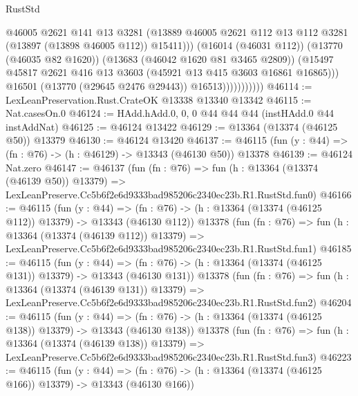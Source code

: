 \begin{lexlean}{RustStd}
\begin{coremodule}
                                @46005
                                @2621
                                @141
                                @13
                                @3281
                                (@13889
                                  @46005
                                  @2621
                                  @112
                                  @13
                                  @112
                                  @3281
                                  (@13897 (@13898 @46005 @112))
                                  @15411)))
                            (@16014 (@46031 @112))
                            (@13770 (@46035 @82 @1620))
                            (@13683 (@46042 @1620 @81 @3465 @2809))
                            (@15497
                              @45817
                              @2621
                              @416
                              @13
                              @3603
                              (@45921 @13 @415 @3603 @16861 @16865)))
                          @16501
                          (@13770 (@29645 @2476 @29443))
                          @16513)))))))))))
@46114 := LexLeanPreservation.Rust.CrateOK @13338 @13340 @13342
@46115 := Nat.casesOn.{0}
@46124 := HAdd.hAdd.{0, 0, 0} @44 @44 @44 (instHAdd.{0} @44 instAddNat)
@46125 := @46124 @13422
@46129 := @13364 (@13374 (@46125 @50)) @13379
@46130 := @46124 @13420
@46137 := @46115 (fun (y : @44) => (fn : @76) -> (h : @46129) -> @13343 (@46130 @50)) @13378
@46139 := @46124 Nat.zero
@46147 := @46137
    (fun (fn : @76) =>
    fun (h : @13364 (@13374 (@46139 @50)) @13379) =>
    LexLeanPreserve.Cc5b6f2e6d9333bad985206c2340ec23b.R1.RustStd.fun0)
@46166 := @46115
    (fun (y : @44) =>
    (fn : @76) -> (h : @13364 (@13374 (@46125 @112)) @13379) -> @13343 (@46130 @112))
    @13378
    (fun (fn : @76) =>
    fun (h : @13364 (@13374 (@46139 @112)) @13379) =>
    LexLeanPreserve.Cc5b6f2e6d9333bad985206c2340ec23b.R1.RustStd.fun1)
@46185 := @46115
    (fun (y : @44) =>
    (fn : @76) -> (h : @13364 (@13374 (@46125 @131)) @13379) -> @13343 (@46130 @131))
    @13378
    (fun (fn : @76) =>
    fun (h : @13364 (@13374 (@46139 @131)) @13379) =>
    LexLeanPreserve.Cc5b6f2e6d9333bad985206c2340ec23b.R1.RustStd.fun2)
@46204 := @46115
    (fun (y : @44) =>
    (fn : @76) -> (h : @13364 (@13374 (@46125 @138)) @13379) -> @13343 (@46130 @138))
    @13378
    (fun (fn : @76) =>
    fun (h : @13364 (@13374 (@46139 @138)) @13379) =>
    LexLeanPreserve.Cc5b6f2e6d9333bad985206c2340ec23b.R1.RustStd.fun3)
@46223 := @46115
    (fun (y : @44) =>
    (fn : @76) -> (h : @13364 (@13374 (@46125 @166)) @13379) -> @13343 (@46130 @166))

\end{coremodule}
\end{lexlean}
